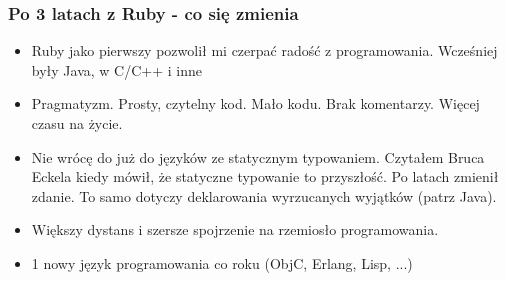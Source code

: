 \documentclass[12t]{beamer}
\begin{document}
\begin{frame}
  \frametitle{Po 3 latach z Ruby - co się zmienia}
  \begin{itemize}
  \item Ruby jako pierwszy pozwolił mi czerpać radość z
    programowania. Wcześniej były Java, w C/C++ i inne
  \item Pragmatyzm. Prosty, czytelny kod. Mało kodu. Brak
    komentarzy. Więcej czasu na życie.
  \item Nie wrócę do już do języków ze statycznym typowaniem. Czytałem
    Bruca Eckela kiedy mówił, że statyczne typowanie to przyszłość. Po
    latach zmienił zdanie. To samo dotyczy deklarowania wyrzucanych
    wyjątków (patrz Java).
  \item Większy dystans i szersze spojrzenie na rzemiosło programowania.
  \item 1 nowy język programowania co roku (ObjC, Erlang, Lisp, ...)
  \end{itemize}
\end{frame}
\end{document}

